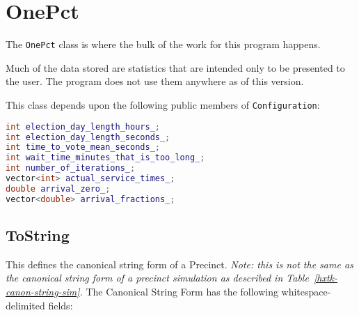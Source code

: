 %

\chapter{OnePct}

The \texttt{OnePct} class is where the bulk of the work for this program happens.

Much of the data stored are statistics that are intended only to be presented to the user. The program does not use them anywhere as of this version.

This class depends upon the following public members of \texttt{Configuration}:

\begin{center}
\begin{lstlisting}[language=C++]
int election_day_length_hours_;
int election_day_length_seconds_;
int time_to_vote_mean_seconds_;
int wait_time_minutes_that_is_too_long_;
int number_of_iterations_;
vector<int> actual_service_times_;
double arrival_zero_;
vector<double> arrival_fractions_;
\end{lstlisting}
\end{center}

\section{ToString} \label{ngrah-onepct-tostring}

This defines the canonical string form of a Precinct. \emph{Note: this is not the same as the canonical string form of a precinct simulation as described in Table~\ref{hxtk-canon-string-sim}.} The Canonical String Form has the following whitespace-delimited fields:

